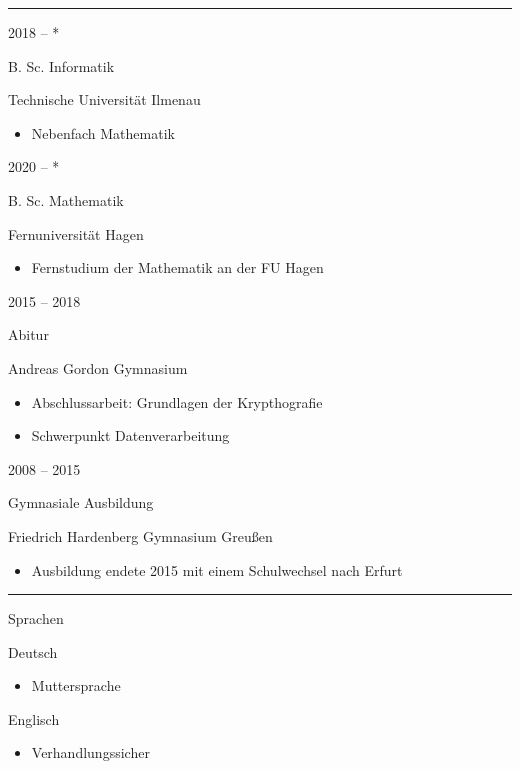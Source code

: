 \documentclass[a4paper,10pt]{article}
\newlength{\cvcolumngapwidth}
\newlength{\cvleftcolumnwidth}
\newlength{\cvrightcolumnwidth}
\newcommand{\cvsectionstyle}[1]{{\normalsize\cvsectionfont\textcolor{cvsectioncolor}{#1}}}
\newcommand{\cvtitlestyle}[1]{{\large\cvtitlefont\textcolor{cvtitlecolor}{#1}}}
\newcommand{\cvdurationstyle}[1]{{\small\cvdurationfont\textcolor{cvdurationcolor}{#1}}}
\newcommand{\cvheadingstyle}[1]{{\normalsize\cvheadingfont\textcolor{cvheadingcolor}{#1}}}
\newlength{\cvafteritemskipamount}
\newlength{\cvaftersectionskipamount}
\newlength{\cvbetweensectionandheadingextraskipamount}
\newlength{\cvaftertitleskipamount}
\newlength{\cvparskip}
\newcommand{\cvsection}[1]{
    \begin{minipage}[t]{\cvleftcolumnwidth}
        \raggedleft\cvsectionstyle{#1}
    \end{minipage}%
    \hspace{\cvcolumngapwidth}%
    \begin{minipage}[t]{\cvrightcolumnwidth}
        \textcolor{cvrulecolor}{\rule{\cvrightcolumnwidth}{0.3mm}}
    \end{minipage}

    \vspace{\cvaftersectionskipamount}
}
\newcommand{\cvitem}[2]{
    \begin{minipage}[t]{\cvleftcolumnwidth}
        \raggedleft #1
    \end{minipage}%
    \hspace{\cvcolumngapwidth}%
    \begin{minipage}[t]{\cvrightcolumnwidth}
        \setlength{\parskip}{\cvparskip} #2
    \end{minipage}

    \vspace{\cvafteritemskipamount}
}
\newcommand{\cvtitle}[1]{
    \cvtitlestyle{#1}

    \vspace{\cvaftertitleskipamount}
    \vspace{-\cvparskip}
}
\begin{document}

\cvsection{Ausbildung}






\cvitem{
    \cvdurationstyle{2018 -- *}
}{
    \cvtitle{B. Sc. Informatik }

    Technische Universität Ilmenau

    \begin{itemize}[leftmargin=*]
        \item Nebenfach Mathematik
    \end{itemize}
}
\cvitem{
    \cvdurationstyle{2020 -- *}
}{
    \cvtitle{B. Sc. Mathematik }

    Fernuniversität Hagen

    \begin{itemize}[leftmargin=*]
        \item Fernstudium der Mathematik an der FU Hagen
    \end{itemize}
}
\cvitem{
    \cvdurationstyle{2015 -- 2018}
}{
    \cvtitle{Abitur}

    Andreas Gordon Gymnasium

    \begin{itemize}[leftmargin=*]
        \item Abschlussarbeit: Grundlagen der Krypthografie
        \item Schwerpunkt Datenverarbeitung
    \end{itemize}
}


\cvitem{
    \cvdurationstyle{2008 -- 2015}
}{
    \cvtitle{Gymnasiale Ausbildung }

    Friedrich Hardenberg Gymnasium Greußen

    \begin{itemize}[leftmargin=*]
        \item Ausbildung endete 2015 mit einem Schulwechsel nach Erfurt
    \end{itemize}
}






\cvsection{SKILLS}

\vspace{\cvbetweensectionandheadingextraskipamount}

\cvitem{
    \cvheadingstyle{Sprachen}
}{
    Deutsch
    \begin{itemize}
        \item Muttersprache
    \end{itemize}
    Englisch
    \begin{itemize}
        \item Verhandlungssicher
    \end{itemize}
}
\end{document}
